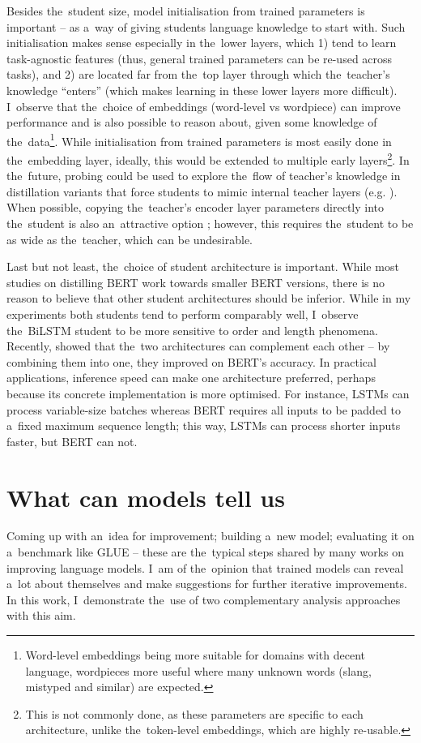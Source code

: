 \documentclass[bsc,frontabs,singlespacing,parskip,deptreport]{infthesis}
\begin{document}
{{    Besides the~student size, model initialisation from trained parameters is important -- as a~way of giving students language knowledge to start with.
    Such initialisation makes sense especially in the~lower layers, which 1) tend to learn task-agnostic features (thus, general trained parameters can be re-used across tasks), and 2) are located far from the~top layer through which the~teacher's knowledge ``enters'' (which makes learning in these lower layers more difficult).
    I~observe that the~choice of embeddings (word-level vs wordpiece) can improve performance and is also possible to reason about, given some knowledge of the~data\footnote{Word-level embeddings being more suitable for domains with decent language, wordpieces more useful where many unknown words (slang, mistyped and similar) are expected.}.
    While initialisation from trained parameters is most easily done in the~embedding layer, ideally, this would be extended to multiple early layers\footnote{This is not commonly done, as these parameters are specific to each architecture, unlike the~token-level embeddings, which are highly re-usable.}. 
    In the~future, probing could be used to explore the~flow of teacher's knowledge in distillation variants that force students to mimic internal teacher layers (e.g. \citet{Jiao_2019,Sun_2019a}).
    When possible, copying the~teacher's encoder layer parameters directly into the~student is also an~attractive option \citep{Sanh_2019};
    however, this requires the~student to be as wide as the~teacher, which can be undesirable.

    Last but not least, the~choice of student architecture is important.
    While most studies on distilling BERT work towards smaller BERT versions, there is no reason to believe that other student architectures should be inferior.
    While in my experiments both students tend to perform comparably well, I~observe the~BiLSTM student to be more sensitive to order and length phenomena.
    Recently, \citet{Huang_2020} showed that the~two architectures can complement each other -- by combining them into one, they improved on BERT's accuracy.
    In practical applications, inference speed can make one architecture preferred, perhaps because its concrete implementation is more optimised.
    For instance, LSTMs can process variable-size batches whereas BERT requires all inputs to be padded to a~fixed maximum sequence length; this way, LSTMs can process shorter inputs faster, but BERT can not.
  }

  \section{What can models tell us}{
    Coming up with an~idea for improvement; building a~new model; evaluating it on a~benchmark like GLUE -- these are the~typical steps shared by many works on improving language models.
    I~am of the~opinion that trained models can reveal a~lot about themselves and make suggestions for further iterative improvements. In this work, I~demonstrate the~use of two complementary analysis approaches with this aim.

}}
\end{document}
